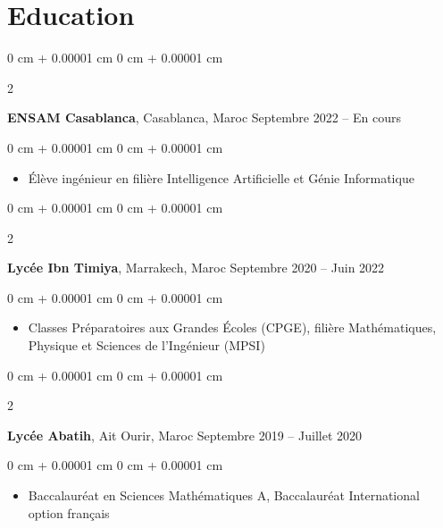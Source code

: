 \documentclass[10pt, letterpaper]{article}
\newenvironment{highlights}{
    \begin{itemize}[
        topsep=0.10 cm,
        parsep=0.10 cm,
        partopsep=0pt,
        itemsep=0pt,
        leftmargin=0 cm + 10pt
    ]
}{
    \end{itemize}
} %
\newenvironment{onecolentry}{
    \begin{adjustwidth}{
        0 cm + 0.00001 cm
    }{
        0 cm + 0.00001 cm
    }
}{
    \end{adjustwidth}
} %
\newenvironment{twocolentry}[2][]{
    \onecolentry
    \def\secondColumn{#2}
    \setcolumnwidth{\fill, 5 cm}
    \begin{paracol}{2}
}{
    \switchcolumn \raggedleft \secondColumn
    \end{paracol}
    \endonecolentry
} %
\begin{document}
    \section{Education}
        
        \begin{twocolentry}{
            Septembre 2022 – En cours
        }
            \textbf{ENSAM Casablanca}, Casablanca, Maroc\end{twocolentry}

        \vspace{0.10 cm}
        \begin{onecolentry}
            \begin{highlights}
                \item Élève ingénieur en filière Intelligence Artificielle et Génie Informatique
            \end{highlights}
        \end{onecolentry}
        
        \vspace{0.5 cm}
        
        \begin{twocolentry}{
        		Septembre 2020 – Juin 2022
        	}
        	\textbf{Lycée Ibn Timiya}, Marrakech, Maroc\end{twocolentry}
        
        \vspace{0.10 cm}
        \begin{onecolentry}
        	\begin{highlights}
        		\item Classes Préparatoires aux Grandes Écoles (CPGE), filière Mathématiques, Physique et Sciences de l'Ingénieur (MPSI)
        	\end{highlights}
        \end{onecolentry}
        
        \vspace{0.5 cm}
        
        \begin{twocolentry}{
        		Septembre 2019 – Juillet 2020
        	}
        	\textbf{Lycée Abatih}, Ait Ourir, Maroc\end{twocolentry}
        
        \vspace{0.10 cm}
        \begin{onecolentry}
        	\begin{highlights}
        		\item Baccalauréat en Sciences Mathématiques A, Baccalauréat International option français
        	\end{highlights}
        \end{onecolentry}
        
\end{document}
